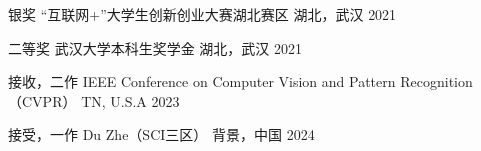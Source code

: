 



\begin{cvhonors}

  \cvhonor
    {银奖} %
    {“互联网+”大学生创新创业大赛湖北赛区} %
    {湖北，武汉} %
    {2021} %

  \cvhonor
    {二等奖} %
    {武汉大学本科生奖学金} %
    {湖北，武汉} %
    {2021} %



\end{cvhonors}




\begin{cvhonors}

  \cvhonor
    {接收，二作} %
    {IEEE Conference on Computer Vision and Pattern Recognition（CVPR）} %
    {TN, U.S.A} %
    {2023} %

  \cvhonor
    {接受，一作} %
    {Du Zhe（SCI三区）} %
    {背景，中国} %
    {2024} %


\end{cvhonors}
